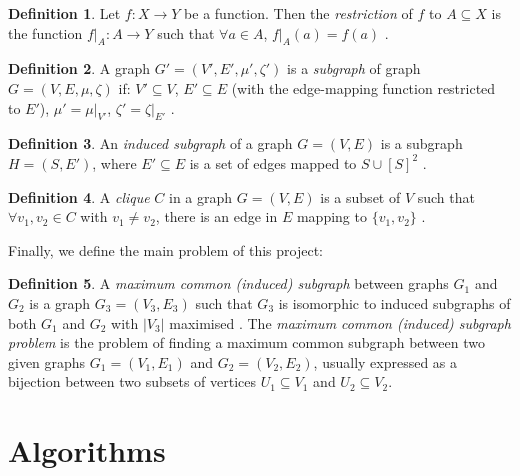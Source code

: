 \documentclass{l4proj}
\theoremstyle{definition}
\newtheorem{definition}{Definition}[chapter]
\theoremstyle{remark}
\begin{document}
\begin{definition}
  Let $f \colon X \to Y$ be a function. Then the \emph{restriction} of $f$ to $A
  \subseteq X$ is the function $f|_A \colon A \to Y$ such that $\forall a \in A$,
  $f|_A(a) = f(a)$ \cite{stoll1979set}.
\end{definition}

\begin{definition} A graph $G' = (V', E', \mu', \zeta')$ is a
  \emph{subgraph} of graph $G = (V, E, \mu, \zeta)$ if: $V' \subseteq V$, $E'
  \subseteq E$ (with the edge-mapping function restricted to $E'$), $\mu' =
  \mu|_{V'}$, $\zeta' = \zeta|_{E'}$ \cite{DBLP:books/daglib/0030488}.
\end{definition}

\begin{definition} \label{def:induced_subgraph}
  An \emph{induced subgraph} of a graph $G = (V, E)$ is a subgraph $H = (S,
  E')$, where $E' \subseteq E$ is a set of edges mapped to $S \cup [S]^2$
  \cite{DBLP:journals/jcamd/RaymondW02a}.
\end{definition}

\begin{definition}
  A \emph{clique} $C$ in a graph $G = (V, E)$ is a subset of $V$ such that
  $\forall v_1, v_2 \in C$ with $v_1 \ne v_2$, there is an edge in $E$ mapping
  to $\{ v_1, v_2 \}$ \cite{DBLP:journals/jgo/PardalosX94a}.
\end{definition}

\noindent Finally, we define the main problem of this project:

\begin{definition}
  A \emph{maximum common (induced) subgraph} between graphs $G_1$ and $G_2$ is a
  graph $G_3 = (V_3, E_3)$ such that $G_3$ is isomorphic to induced subgraphs of
  both $G_1$ and $G_2$ with $|V_3|$ maximised
  \cite{DBLP:journals/jcamd/RaymondW02a}. The \emph{maximum common (induced)
    subgraph problem} is the problem of finding a maximum common subgraph
  between two given graphs $G_1 = (V_1, E_1)$ and $G_2 = (V_2, E_2)$, usually
  expressed as a bijection between two subsets of vertices $U_1 \subseteq V_1$
  and $U_2 \subseteq V_2$.
\end{definition}

\chapter{Algorithms}
\end{document}
